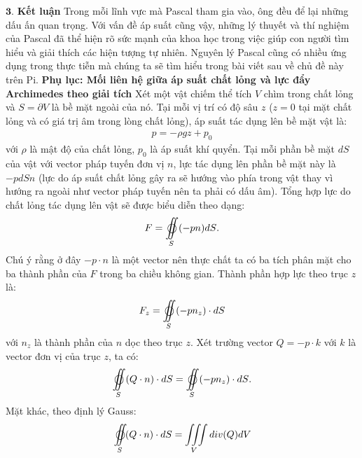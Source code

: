 \begin{multicols}{2}
	\vskip 0.1cm
	$\pmb{3.}$ \textbf{\color{timhieukhoahoc}Kết luận}
	\vskip 0.1cm
	Trong mỗi lĩnh vực mà Pascal tham gia vào, ông đều để lại những dấu ấn quan trọng. Với vấn đề áp suất cũng vậy, những lý  thuyết và thí nghiệm của Pascal đã thể hiện rõ sức mạnh của khoa học trong việc giúp con người tìm hiểu và giải thích các hiện tượng tự nhiên. Nguyên lý Pascal cũng có nhiều ứng dụng trong thực tiễn mà chúng ta sẽ tìm hiểu trong bài viết sau về chủ đề này trên Pi.
	\vskip 0.1cm
	\textbf{\color{timhieukhoahoc}Phụ lục: Mối liên hệ giữa áp suất chất lỏng và lực đẩy Archimedes theo giải tích}
	\vskip 0.1cm
	Xét một vật chiếm thể tích $V$ chìm trong chất lỏng và $S=\partial V$ là bề mặt ngoài của nó. Tại mỗi vị trí có độ sâu $z$ ($z=0$ tại mặt chất lỏng và có giá trị âm trong lòng chất lỏng), áp suất tác dụng lên bề mặt vật là:
	\begin{align*}
		p = - \rho gz + p_0
	\end{align*}
	với $\rho$ là mật độ của chất lỏng, $p_0$ là áp suất khí quyển.
	\vskip 0.1cm
	Tại mỗi phần bề mặt $dS$ của vật với vector pháp tuyến đơn vị $n$, lực tác dụng lên phần bề mặt này là $-p dS n$ (lực do áp suất chất lỏng gây ra sẽ hướng vào phía trong vật thay vì hướng ra ngoài như vector pháp tuyến nên ta phải có dấu âm). Tổng hợp lực do chất lỏng tác dụng lên vật sẽ được biểu diễn theo dạng:
	\begin{align*}
		F = \mathop{{\int\!\!\!\!\!\int}\mkern-21mu \bigcirc}\limits_S 
		{( - pn)dS}.
	\end{align*}
	Chú ý rằng ở đây $-p\cdot n$ là một vector nên thực chất ta có ba tích phân mặt cho ba thành phần của $F$ trong ba chiều không gian.
	\vskip 0.1cm
	Thành phần hợp lực theo trục $z$ là:
	\begin{align*}
		{F_z} = \mathop{{\int\!\!\!\!\!\int}\mkern-21mu \bigcirc}\limits_S 
		{( - p{n_z}) \cdot dS}
	\end{align*}	
	với $n_z$ là thành phần của $n$ dọc theo trục $z$.
	\vskip 0.1cm
	Xét trường vector $Q=-p\cdot k$ với $k$ là vector đơn vị của trục $z$, ta có:
	\begin{align*}
		\mathop{{\int\!\!\!\!\!\int}\mkern-21mu \bigcirc}\limits_S 
		{(Q \cdot n) \cdot dS = \mathop{{\int\!\!\!\!\!\int}\mkern-21mu \bigcirc}\limits_S 
			{( - p{n_z}) \cdot dS} }.
	\end{align*}
	Mặt khác, theo định lý  Gauss:
	\begin{align*}
		&\mathop{{\int\!\!\!\!\!\int}\mkern-21mu \bigcirc}\limits_S 
		(Q \cdot n) \cdot dS = \iiint\limits_V div(Q)dV \\

\end{align*}
\end{multicols}
